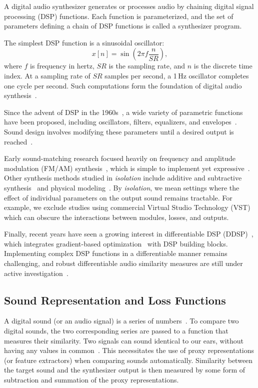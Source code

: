 A digital audio synthesizer generates or processes audio by chaining digital signal processing (\gls{DSP}) functions. 
Each function is parameterized, and the set of parameters defining a chain of DSP functions is called a synthesizer program. 

The simplest DSP function is a sinusoidal oscillator: 
\[
x[n] = \sin\!\left(2 \pi f \frac{n}{SR}\right),
\]
where $f$ is frequency in hertz, $SR$ is the sampling rate, and $n$ is the discrete time index. 
At a sampling rate of $SR$ samples per second, a 1\,Hz oscillator completes one cycle per second. 
Such computations form the foundation of digital audio synthesis~\cite{lyons1997understanding}. 

Since the advent of DSP in the 1960s~\cite{stranneby2004digital}, a wide variety of parametric functions have been proposed, including oscillators, filters, equalizers, and envelopes~\cite{lyons1997understanding,russ1999sound}. 
Sound design involves modifying these parameters until a desired output is reached~\cite{roads1996computer,pinch2004analog}. 

Early sound-matching research focused heavily on frequency and amplitude modulation (\gls{FM}/\gls{AM}) synthesis~\cite{horner1993machine,mitchell2007evolutionary,vahidi2023mesostructures}, which is simple to implement yet expressive~\cite{chowning1973synthesis}. 
Other synthesis methods studied in \textit{isolation} include additive and subtractive synthesis~\cite{engel2020ddsp,masuda2023improving,salimi2020make} and physical modeling~\cite{riionheimo2003parameter,han2024learning}. By \textit{isolation}, we mean settings where the effect of individual parameters on the output sound remains tractable. For example, we exclude studies using commercial Virtual Studio Technology (VST) which can obscure the interactions between modules, losses, and outputs. 

Finally, recent years have seen a growing interest in differentiable DSP (\gls{DDSP})~\cite{engel2020ddsp}, which integrates gradient-based optimization~\cite{goodfellow2016deep,boyd2004convex} with DSP building blocks. 
Implementing complex DSP functions in a differentiable manner remains challenging, and robust differentiable audio similarity measures are still under active investigation~\cite{masuda2021soundmatch,vahidi2023mesostructures,uzrad2024diffmoog}.


\subsection{Sound Representation and Loss Functions}
\label{sec:loss_funcs}
A digital sound (or an audio signal) is a series of numbers~\cite{smith1991viewpoints,smith2007mathematics}. To compare two digital sounds, the two corresponding series are passed to a function that measures their similarity. Two signals can sound identical to our ears, without having any values in common~\cite{moore2012introduction}. This necessitates the use of proxy representations (or feature extractors) when comparing sounds automatically. Similarity between the target sound and the synthesizer output is then measured by some form of subtraction and summation of the proxy representations.

